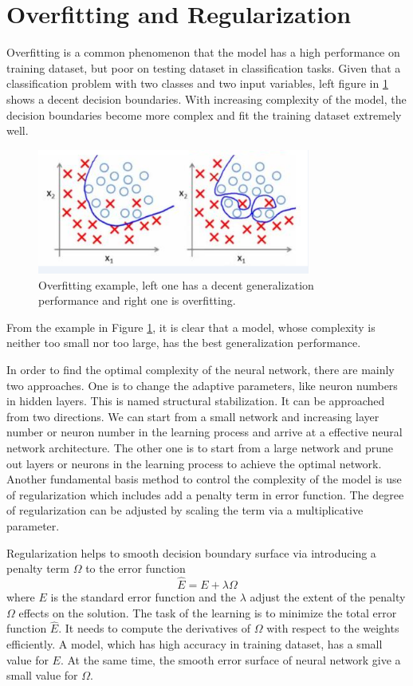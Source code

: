 \section{Overfitting and Regularization}

Overfitting is a common phenomenon that the model has a high performance on training dataset, but poor on testing dataset in classification tasks. Given that a classification problem with two classes and two input variables, left figure in \ref{fig:OverfittingExample} shows a decent decision boundaries. With increasing complexity of the model, the decision boundaries become more complex and fit the training dataset extremely well. 
\graphicspath{ {./Figures/} }
\begin{figure}[!htb]
\centering
\includegraphics[width=0.8\textwidth]{overfitting.png}
\caption{\label{fig:OverfittingExample}Overfitting example, left one has a decent generalization performance and right one is overfitting.}
\end{figure}
From the example in Figure \ref{fig:OverfittingExample}, it is clear that a model, whose complexity is neither too small nor too large, has the best generalization performance. 

In order to find the optimal complexity of the neural network, there are mainly two approaches. One is to change the adaptive parameters, like neuron numbers in hidden layers. This is named structural stabilization. It can be approached from two directions. We can start from a small network and increasing layer number or neuron number in the learning process and arrive at a effective neural network architecture. The other one is to start from a large network and prune out layers or neurons in the learning process to achieve the optimal network. Another fundamental basis method to control the complexity of the model is use of regularization which includes add a penalty term in error function. The degree of regularization can be adjusted by scaling the term via a multiplicative parameter.

Regularization helps to smooth decision boundary surface via introducing a penalty term $\Omega$ to the error function
\begin{equation}\label{eq:Regularization}
\hat{E} = E + \lambda\Omega
\end{equation}
where $E$ is the standard error function and the $\lambda$ adjust the extent of the penalty $\Omega$ effects on the solution. The task of the learning is to minimize the total error function $\hat{E}$. It needs to compute the derivatives of $\Omega$ with respect to the weights efficiently. A model, which has high accuracy in training dataset, has a small value for $E$. At the same time, the smooth error surface of neural network give a small value for $\Omega$.

